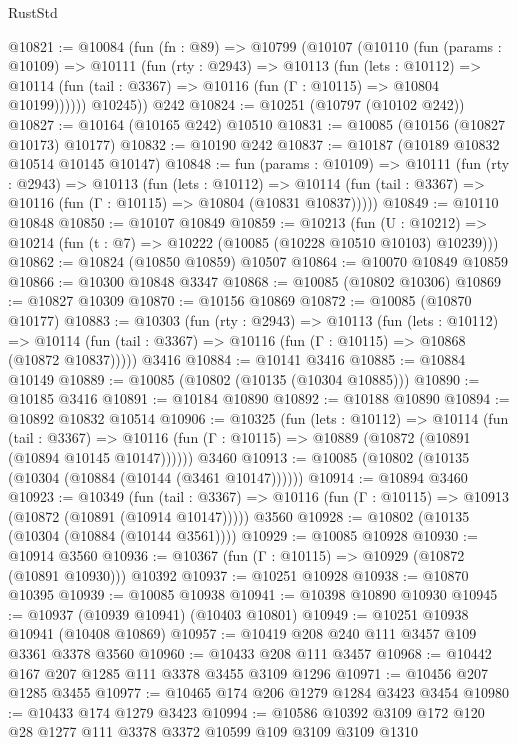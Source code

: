 \begin{lexlean}{RustStd}
\begin{coremodule}
@10821 := @10084
    (fun (fn : @89) =>
    @10799
      (@10107
        (@10110
          (fun (params : @10109) =>
          @10111
            (fun (rty : @2943) =>
            @10113
              (fun (lets : @10112) =>
              @10114 (fun (tail : @3367) => @10116 (fun (Γ : @10115) => @10804 @10199))))))
        @10245))
    @242
@10824 := @10251 (@10797 (@10102 @242))
@10827 := @10164 (@10165 @242) @10510
@10831 := @10085 (@10156 (@10827 @10173) @10177)
@10832 := @10190 @242
@10837 := @10187 (@10189 @10832 @10514 @10145 @10147)
@10848 := fun (params : @10109) =>
  @10111
    (fun (rty : @2943) =>
    @10113
      (fun (lets : @10112) =>
      @10114 (fun (tail : @3367) => @10116 (fun (Γ : @10115) => @10804 (@10831 @10837)))))
@10849 := @10110 @10848
@10850 := @10107 @10849
@10859 := @10213
    (fun (U : @10212) => @10214 (fun (t : @7) => @10222 (@10085 (@10228 @10510 @10103) @10239)))
@10862 := @10824 (@10850 @10859) @10507
@10864 := @10070 @10849 @10859
@10866 := @10300 @10848 @3347
@10868 := @10085 (@10802 @10306)
@10869 := @10827 @10309
@10870 := @10156 @10869
@10872 := @10085 (@10870 @10177)
@10883 := @10303
    (fun (rty : @2943) =>
    @10113
      (fun (lets : @10112) =>
      @10114 (fun (tail : @3367) => @10116 (fun (Γ : @10115) => @10868 (@10872 @10837)))))
    @3416
@10884 := @10141 @3416
@10885 := @10884 @10149
@10889 := @10085 (@10802 (@10135 (@10304 @10885)))
@10890 := @10185 @3416
@10891 := @10184 @10890
@10892 := @10188 @10890
@10894 := @10892 @10832 @10514
@10906 := @10325
    (fun (lets : @10112) =>
    @10114
      (fun (tail : @3367) =>
      @10116 (fun (Γ : @10115) => @10889 (@10872 (@10891 (@10894 @10145 @10147))))))
    @3460
@10913 := @10085 (@10802 (@10135 (@10304 (@10884 (@10144 (@3461 @10147))))))
@10914 := @10894 @3460
@10923 := @10349
    (fun (tail : @3367) => @10116 (fun (Γ : @10115) => @10913 (@10872 (@10891 (@10914 @10147)))))
    @3560
@10928 := @10802 (@10135 (@10304 (@10884 (@10144 @3561))))
@10929 := @10085 @10928
@10930 := @10914 @3560
@10936 := @10367 (fun (Γ : @10115) => @10929 (@10872 (@10891 @10930))) @10392
@10937 := @10251 @10928
@10938 := @10870 @10395
@10939 := @10085 @10938
@10941 := @10398 @10890 @10930
@10945 := @10937 (@10939 @10941) (@10403 @10801)
@10949 := @10251 @10938 @10941 (@10408 @10869)
@10957 := @10419 @208 @240 @111 @3457 @109 @3361 @3378 @3560
@10960 := @10433 @208 @111 @3457
@10968 := @10442 @167 @207 @1285 @111 @3378 @3455 @3109 @1296
@10971 := @10456 @207 @1285 @3455
@10977 := @10465 @174 @206 @1279 @1284 @3423 @3454
@10980 := @10433 @174 @1279 @3423
@10994 := @10586 @10392 @3109 @172 @120 @28 @1277 @111 @3378 @3372 @10599 @109 @3109 @3109 @1310

\end{coremodule}
\end{lexlean}
